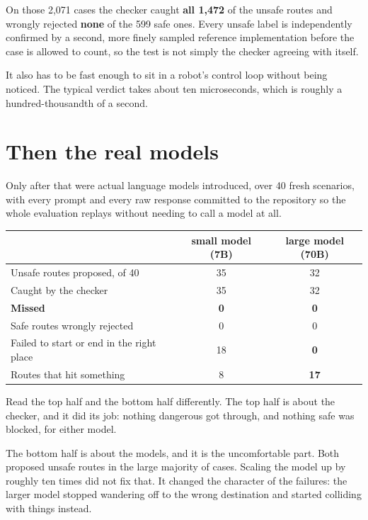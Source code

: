 \documentclass[11pt,a4paper]{article}
\begin{document}
On those 2,071 cases the checker caught \textbf{all 1,472} of the unsafe routes and wrongly rejected \textbf{none} of the 599 safe ones. Every unsafe label is independently confirmed by a second, more finely sampled reference implementation before the case is allowed to count, so the test is not simply the checker agreeing with itself.

It also has to be fast enough to sit in a robot's control loop without being noticed. The typical verdict takes about ten microseconds, which is roughly a hundred-thousandth of a second.

\section{Then the real models}

Only after that were actual language models introduced, over 40 fresh scenarios, with every prompt and every raw response committed to the repository so the whole evaluation replays without needing to call a model at all.

\begin{center}
\small
\begin{tabular}{lcc}
\toprule
& small model (7B) & large model (70B) \\
\midrule
Unsafe routes proposed, of 40 & 35 & 32 \\
Caught by the checker & 35 & 32 \\
\textbf{Missed} & \textbf{0} & \textbf{0} \\
Safe routes wrongly rejected & 0 & 0 \\
Failed to start or end in the right place & 18 & \textbf{0} \\
Routes that hit something & 8 & \textbf{17} \\
\bottomrule
\end{tabular}
\end{center}

Read the top half and the bottom half differently. The top half is about the checker, and it did its job: nothing dangerous got through, and nothing safe was blocked, for either model.

The bottom half is about the models, and it is the uncomfortable part. Both proposed unsafe routes in the large majority of cases. Scaling the model up by roughly ten times did not fix that. It changed the character of the failures: the larger model stopped wandering off to the wrong destination and started colliding with things instead.
\end{document}
